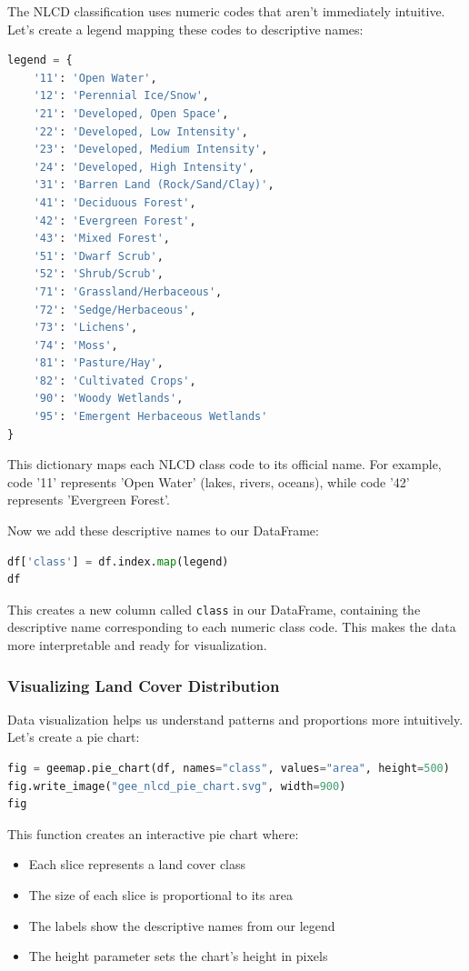 The NLCD classification uses numeric codes that aren't immediately intuitive. Let's create a legend mapping these codes to descriptive names:

\begin{lstlisting}[language=Python]
legend = {
    '11': 'Open Water',
    '12': 'Perennial Ice/Snow',
    '21': 'Developed, Open Space',
    '22': 'Developed, Low Intensity',
    '23': 'Developed, Medium Intensity',
    '24': 'Developed, High Intensity',
    '31': 'Barren Land (Rock/Sand/Clay)',
    '41': 'Deciduous Forest',
    '42': 'Evergreen Forest',
    '43': 'Mixed Forest',
    '51': 'Dwarf Scrub',
    '52': 'Shrub/Scrub',
    '71': 'Grassland/Herbaceous',
    '72': 'Sedge/Herbaceous',
    '73': 'Lichens',
    '74': 'Moss',
    '81': 'Pasture/Hay',
    '82': 'Cultivated Crops',
    '90': 'Woody Wetlands',
    '95': 'Emergent Herbaceous Wetlands'
}
\end{lstlisting}

This dictionary maps each NLCD class code to its official name. For example, code '11' represents 'Open Water' (lakes, rivers, oceans), while code '42' represents 'Evergreen Forest'.

Now we add these descriptive names to our DataFrame:

\begin{lstlisting}[language=Python]
df['class'] = df.index.map(legend)
df
\end{lstlisting}

This creates a new column called \texttt{class} in our DataFrame, containing the descriptive name corresponding to each numeric class code. This makes the data more interpretable and ready for visualization.

\subsubsection{Visualizing Land Cover Distribution}

Data visualization helps us understand patterns and proportions more intuitively. Let's create a pie chart:

\begin{lstlisting}[language=Python]
fig = geemap.pie_chart(df, names="class", values="area", height=500)
fig.write_image("gee_nlcd_pie_chart.svg", width=900)
fig
\end{lstlisting}

This function creates an interactive pie chart where:

\begin{itemize}
\item Each slice represents a land cover class
\item The size of each slice is proportional to its area
\item The labels show the descriptive names from our legend
\item The height parameter sets the chart's height in pixels
\end{itemize}

